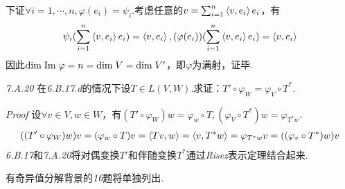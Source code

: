 下证\(\forall i=1,\cdots,n,\varphi(e_i)=\psi_i\).考虑任意的\(v=\sum_{i=1}^n \left\langle v,e_i \right\rangle e_i\)，有
    \begin{align*}
        \psi_i(\sum_{i=1}^n \left\langle v,e_i \right\rangle e_i)=\left\langle v,e_i \right\rangle,
        (\varphi(e_i))(\sum_{i=1}^n \left\langle v,e_i \right\rangle e_i)=\left\langle v,e_i \right\rangle
    \end{align*}
因此\(\mathrm{dim \;} \mathrm{Im \;} \varphi=n=\mathrm{dim \;} V=\mathrm{dim \;} V'\)，即\(\varphi\)为满射，证毕.

\hspace*{\fill}

\textit{7.A.20}
在\textit{6.B.17.d}的情况下设\(T \in L(V,W)\).求证：\(T' \circ \varphi_W=\varphi_V \circ T^*\).

\textit{Proof}
设\(\forall v \in V,w \in W\)，有\((T' \circ \varphi_W)w=\varphi_w \circ T,(\varphi_V \circ T^*)w=\varphi_{T^*w}\).
    \begin{align*}
        ((T' \circ \varphi_W)w)v=(\varphi_w \circ T)v=\left\langle Tv,w \right\rangle
        =\left\langle v,T^*w \right\rangle=\varphi_{T^*w}v=((\varphi_v \circ T^*)w)v
    \end{align*}
\textit{6.B.17}和\textit{7.A.20}将对偶变换\(T'\)和伴随变换\(T^*\)通过\textit{Risez}表示定理结合起来.

\hspace*{\fill}

有奇异值分解背景的\textit{16}题将单独列出.

